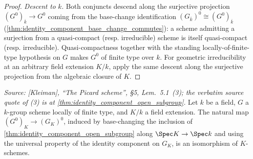\begin{proof}
  \emph{Descent to \(k\).}  Both conjuncts descend along the surjective
  projection \((G^0)_{\overline k} \to G^0\) coming from the base-change
  identification \((G_{\overline k})^0 \cong (G^0)_{\overline k}\)
  (\cref{thm:identity_component_base_change_commutes}): a scheme admitting a
  surjection from a quasi-compact (resp. irreducible) scheme is itself
  quasi-compact (resp. irreducible). Quasi-compactness together with the
  standing locally-of-finite-type hypothesis on \(G\) makes \(G^0\) of
  finite type over \(k\). For geometric irreducibility at an arbitrary field
  extension \(K/k\), apply the same descent along the surjective projection
  from the algebraic closure of \(K\).
\end{proof}

\begin{theorem}

  \label{thm:identity_component_base_change_commutes}

  \textit{Source: [Kleiman], ``The Picard scheme'', \S 5,
  Lem.~5.1~(3); the verbatim source quote of (3) is at
  \cref{thm:identity_component_open_subgroup}.}
  Let \(k\) be a field, \(G\) a \(k\)-group scheme locally of finite
  type, and \(K/k\) a field extension. The natural map
  \((G^0)_K \to (G_K)^0\), induced by base-changing the inclusion of
  \cref{thm:identity_component_open_subgroup} along \(\Spec K \to \Spec k\)
  and using the universal property of the identity component on
  \(G_K\), is an isomorphism of \(K\)-schemes.
\end{theorem}

